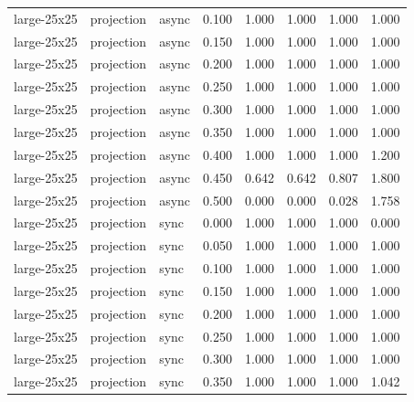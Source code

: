 \begin{tabular}{lllrrrrr}
large-25x25 & projection & async & 0.100 & 1.000 & 1.000 & 1.000 & 1.000 \\

large-25x25 & projection & async & 0.150 & 1.000 & 1.000 & 1.000 & 1.000 \\

large-25x25 & projection & async & 0.200 & 1.000 & 1.000 & 1.000 & 1.000 \\

large-25x25 & projection & async & 0.250 & 1.000 & 1.000 & 1.000 & 1.000 \\

large-25x25 & projection & async & 0.300 & 1.000 & 1.000 & 1.000 & 1.000 \\

large-25x25 & projection & async & 0.350 & 1.000 & 1.000 & 1.000 & 1.000 \\

large-25x25 & projection & async & 0.400 & 1.000 & 1.000 & 1.000 & 1.200 \\

large-25x25 & projection & async & 0.450 & 0.642 & 0.642 & 0.807 & 1.800 \\

large-25x25 & projection & async & 0.500 & 0.000 & 0.000 & 0.028 & 1.758 \\

large-25x25 & projection & sync & 0.000 & 1.000 & 1.000 & 1.000 & 0.000 \\

large-25x25 & projection & sync & 0.050 & 1.000 & 1.000 & 1.000 & 1.000 \\

large-25x25 & projection & sync & 0.100 & 1.000 & 1.000 & 1.000 & 1.000 \\

large-25x25 & projection & sync & 0.150 & 1.000 & 1.000 & 1.000 & 1.000 \\

large-25x25 & projection & sync & 0.200 & 1.000 & 1.000 & 1.000 & 1.000 \\

large-25x25 & projection & sync & 0.250 & 1.000 & 1.000 & 1.000 & 1.000 \\

large-25x25 & projection & sync & 0.300 & 1.000 & 1.000 & 1.000 & 1.000 \\

large-25x25 & projection & sync & 0.350 & 1.000 & 1.000 & 1.000 & 1.042 \\


\end{tabular}
